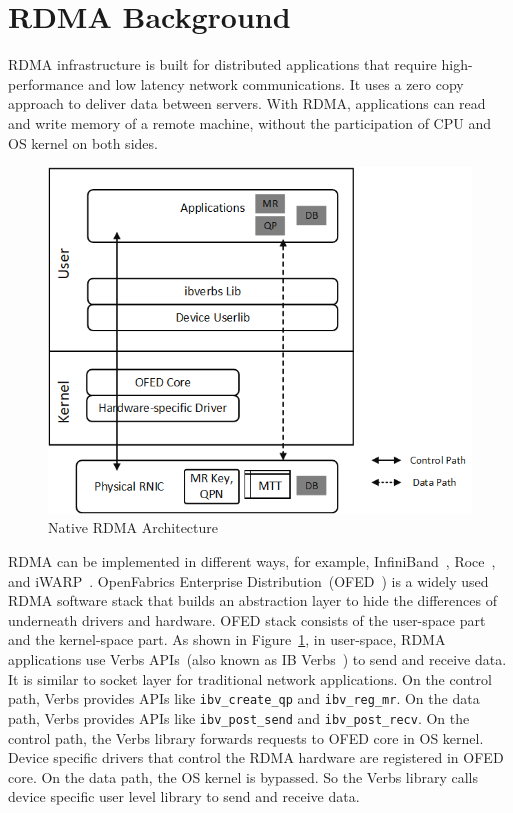 \section{RDMA Background} \label{background}
RDMA infrastructure is built for distributed applications that require high-performance and low latency network communications. It uses a zero copy approach to deliver data between servers. With RDMA, applications can read and write memory of a remote machine, without the participation of CPU and OS kernel on both sides.

\begin{figure}[!ht]
	\centering
	\includegraphics[width=0.85\linewidth]{images/rdma-feat.png}
	\caption{Native RDMA Architecture}
	\label{fig:rdma-feat}
\end{figure}

RDMA can be implemented in different ways, for example, InfiniBand~\cite{infiniband}, Roce~\cite{roce}, and iWARP~\cite{iwarp}.
OpenFabrics Enterprise Distribution~(OFED~\cite{ofed-manual}) is a widely used RDMA software stack that builds an abstraction layer to hide the differences of underneath drivers and hardware.
OFED stack consists of the user-space part and the kernel-space part.
As shown in Figure~\ref{fig:rdma-feat}, in user-space, RDMA applications use Verbs APIs~(also known as IB Verbs~\cite{verbs}) to send and receive data. It is similar to socket layer for traditional network applications. On the control path, Verbs provides APIs like \texttt{ibv\_create\_qp} and \texttt{ibv\_reg\_mr}. On the data path, Verbs provides APIs like \texttt{ibv\_post\_send} and \texttt{ibv\_post\_recv}. On the control path, the Verbs library forwards requests to OFED core in OS kernel. Device specific drivers that control the RDMA hardware are registered in OFED core. On the data path, the OS kernel is bypassed. So the Verbs library calls device specific user level library to send and receive data.

